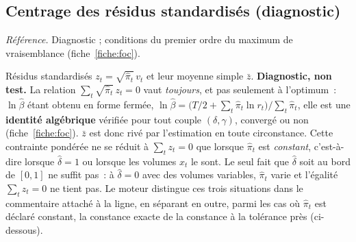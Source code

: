 \documentclass[a4paper,11pt]{article}
\newcommand{\refl}[1]{{\small\textcolor{maincolor!70!black}{\textit{Référence.} #1}}\par\smallskip}
\newcounter{ficheid}
\newenvironment{fiche}[1]{%
  \stepcounter{ficheid}%
  \phantomsection
  \subsection{#1}%
  \label{fiche:\theficheid}%
}{%
  \end{description}\vspace{0.5em}%
}
\newcommand{\Cadre}{%
  \begin{description}[leftmargin=0pt, style=unboxed, itemsep=3pt, topsep=3pt, parsep=2pt]%
  \item[\textcolor{financeblue}{\textbf{1. Cadre, notations et hypothèses de validité (non testées).}}]}
\begin{document}
\begin{fiche}{Centrage des résidus standardisés (diagnostic)}
\label{fiche:centrage}%
\refl{Diagnostic ; conditions du premier ordre du maximum de vraisemblance
(fiche~\ref{fiche:foc}).}
\Cadre
Résidus standardisés $z_t = \sqrt{\hat\pi_t}\,v_t$ et leur moyenne simple $\bar z$.
\textbf{Diagnostic, non test.} La relation $\sum_t\sqrt{\hat\pi_t}\,z_t = 0$ vaut
\emph{toujours}, et pas seulement à l'optimum~: $\ln\hat\beta$ étant obtenu en forme fermée,
$\ln\hat\beta = \big(T/2 + \sum_t\hat\pi_t\ln r_t\big)\big/\sum_t\hat\pi_t$, elle est une
\textbf{identité algébrique} vérifiée pour tout couple $(\delta,\gamma)$, convergé ou non
(fiche~\ref{fiche:foc}). $\bar z$ est donc rivé par l'estimation en toute circonstance. Cette
contrainte pondérée ne se réduit à $\sum_t z_t = 0$ que lorsque
$\hat\pi_t$ est \emph{constant}, c'est-à-dire lorsque $\hat\delta = 1$ ou lorsque les volumes
$x_t$ le sont. Le seul fait que $\hat\delta$ soit au bord de $[0,1]$ ne suffit pas~: à
$\hat\delta = 0$ avec des volumes variables, $\hat\pi_t$ varie et l'égalité $\sum_t z_t = 0$
ne tient pas. Le moteur distingue ces trois situations dans le commentaire attaché à la ligne,
en séparant en outre, parmi les cas où $\hat\pi_t$ est déclaré constant, la constance exacte de
la constance à la tolérance près (ci-dessous).


\end{fiche}
\end{document}
